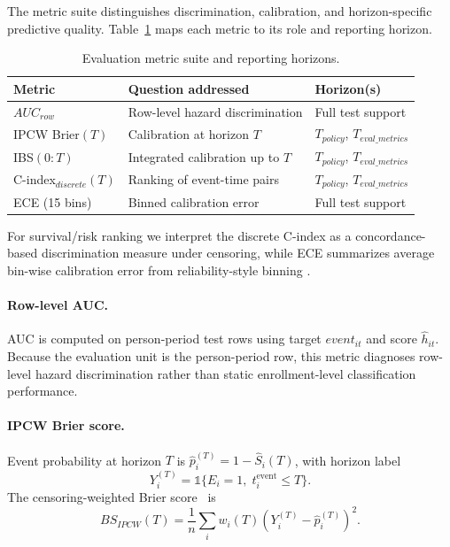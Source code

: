 The metric suite distinguishes discrimination, calibration, and horizon-specific predictive quality. Table~\ref{tab:metric_suite} maps each metric to its role and reporting horizon.

\begin{table}[!t]
\centering
\footnotesize
\renewcommand{\arraystretch}{1.05}
\caption{Evaluation metric suite and reporting horizons.}
\label{tab:metric_suite}
\begin{tabular}{@{}p{} p{} p{}@{}}
\hline
Metric & Question addressed & Horizon(s) \\
\hline
$AUC_{row}$ &
  Row-level hazard discrimination &
  Full test support \\
IPCW Brier$(T)$ &
  Calibration at horizon $T$ &
  $T_{policy}$, $T_{eval\_metrics}$ \\
IBS$(0{:}T)$ &
  Integrated calibration up to $T$ &
  $T_{policy}$, $T_{eval\_metrics}$ \\
C-index$_{discrete}(T)$ &
  Ranking of event-time pairs &
  $T_{policy}$, $T_{eval\_metrics}$ \\
ECE (15 bins) &
  Binned calibration error &
  Full test support \\
\hline
\end{tabular}
\end{table}

For survival/risk ranking we interpret the discrete C-index as a concordance-based discrimination measure under censoring, while ECE summarizes average bin-wise calibration error from reliability-style binning \cite{Uno2011CStatisticsCensored,Fan2021RecurrenceCalibration}.

\paragraph*{Row-level AUC.}
AUC is computed on person-period test rows using target $event_{it}$ and score $\hat h_{it}$. Because the evaluation unit is the person-period row, this metric diagnoses row-level hazard discrimination rather than static enrollment-level classification performance.

\paragraph*{IPCW Brier score.}
Event probability at horizon $T$ is $\hat p_i^{(T)}=1-\hat S_i(T)$, with horizon label
\[
Y_i^{(T)}=\mathbb{1}\{E_i=1,\;t_i^{\mathrm{event}}\le T\}.
\]
The censoring-weighted Brier score~\cite{Graf1999AssessmentSurvivalPrediction} is
\begin{equation*}
BS_{IPCW}(T)=\frac{1}{n}\sum_i w_i(T)\left(Y_i^{(T)}-\hat p_i^{(T)}\right)^2.
\end{equation*}

